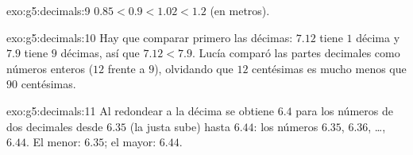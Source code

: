 \begin{solution}{exo:g5:decimals:9}
$0.85 < 0.9 < 1.02 < 1.2$ (en metros).
\end{solution}

\begin{solution}{exo:g5:decimals:10}
Hay que comparar primero las décimas: $7.12$ tiene $1$ décima y $7.9$ tiene $9$
décimas, así que $7.12 < 7.9$. Lucía comparó las partes decimales como números
enteros ($12$ frente a $9$), olvidando que $12$ centésimas es mucho menos
que $90$ centésimas.
\end{solution}

\begin{solution}{exo:g5:decimals:11}
Al redondear a la décima se obtiene $6.4$ para los números de dos decimales desde
$6.35$ (la  justa sube) hasta $6.44$: los números $6.35$, $6.36$,
\dots, $6.44$. El menor: $6.35$; el mayor: $6.44$.
\end{solution}
